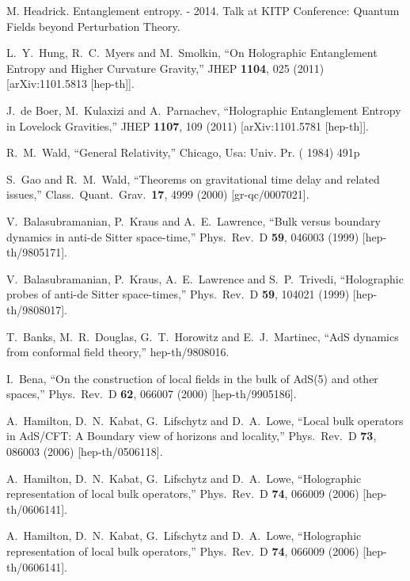 \documentclass[12pt]{article}
\theoremstyle{remark}
\numberwithin{equation}{section}
\numberwithin{equation}{section}
\begin{document}
\begin{thebibliography}{99}
M. Headrick. Entanglement entropy. - 2014. Talk at KITP Conference: Quantum Fields beyond Perturbation Theory.

  L.~Y.~Hung, R.~C.~Myers and M.~Smolkin,
  ``On Holographic Entanglement Entropy and Higher Curvature Gravity,''
  JHEP {\bf 1104}, 025 (2011)
  [arXiv:1101.5813 [hep-th]].

  J.~de Boer, M.~Kulaxizi and A.~Parnachev,
  ``Holographic Entanglement Entropy in Lovelock Gravities,''
  JHEP {\bf 1107}, 109 (2011)
  [arXiv:1101.5781 [hep-th]].



  R.~M.~Wald,
  ``General Relativity,''
  Chicago, Usa: Univ. Pr. ( 1984) 491p

 S.~Gao and R.~M.~Wald,
  ``Theorems on gravitational time delay and related issues,''
  Class.\ Quant.\ Grav.\  {\bf 17}, 4999 (2000)
  [gr-qc/0007021].

 V.~Balasubramanian, P.~Kraus and A.~E.~Lawrence,
  ``Bulk versus boundary dynamics in anti-de Sitter space-time,''
  Phys.\ Rev.\ D {\bf 59}, 046003 (1999)
  [hep-th/9805171].

V.~Balasubramanian, P.~Kraus, A.~E.~Lawrence and S.~P.~Trivedi,
  ``Holographic probes of anti-de Sitter space-times,''
  Phys.\ Rev.\ D {\bf 59}, 104021 (1999)
  [hep-th/9808017].

 T.~Banks, M.~R.~Douglas, G.~T.~Horowitz and E.~J.~Martinec,
  ``AdS dynamics from conformal field theory,''
  hep-th/9808016.

 I.~Bena,
  ``On the construction of local fields in the bulk of AdS(5) and other spaces,''
  Phys.\ Rev.\ D {\bf 62}, 066007 (2000)
  [hep-th/9905186].

A.~Hamilton, D.~N.~Kabat, G.~Lifschytz and D.~A.~Lowe,
  ``Local bulk operators in AdS/CFT: A Boundary view of horizons and locality,''
  Phys.\ Rev.\ D {\bf 73}, 086003 (2006)
  [hep-th/0506118].

  A.~Hamilton, D.~N.~Kabat, G.~Lifschytz and D.~A.~Lowe,
  ``Holographic representation of local bulk operators,''
  Phys.\ Rev.\ D {\bf 74}, 066009 (2006)
  [hep-th/0606141].

  A.~Hamilton, D.~N.~Kabat, G.~Lifschytz and D.~A.~Lowe,
  ``Holographic representation of local bulk operators,''
  Phys.\ Rev.\ D {\bf 74}, 066009 (2006)
  [hep-th/0606141].


\end{thebibliography}
\end{document}
